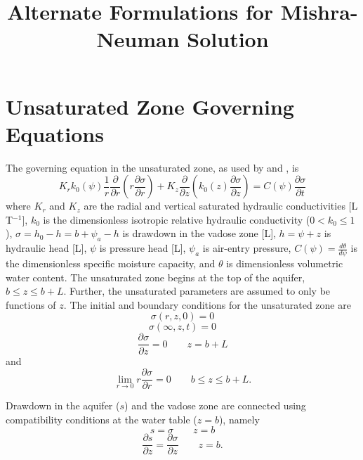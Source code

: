 \documentclass[12pt,letterpaper]{article}
\title{Alternate Formulations for Mishra-Neuman Solution}
\begin{document}
\maketitle
\linenumbers
\section{Unsaturated Zone Governing Equations}
The governing equation in the unsaturated zone, as used by \cite{mishra10} and \cite{tartakovsky07}, is
\begin{equation}
  \label{eq:unsatDim}
  K_r k_0(\psi) \frac{1}{r} \frac{\partial}{\partial r} \left( r\frac{\partial \sigma}{\partial r} \right) + K_z \frac{\partial}{\partial z} \left( k_0(z) \frac{\partial \sigma}{\partial z}\right) = C(\psi) \frac{\partial \sigma}{\partial t}
\end{equation}
where $K_r$ and $K_z$ are the radial and vertical saturated hydraulic conductivities [L T$^{-1}$], $k_0$ is the dimensionless isotropic relative hydraulic conductivity ($0 < k_0 \le 1$), $\sigma = h_0 - h = b +\psi_a - h$ is drawdown in the vadose zone [L], $h=\psi+z$ is hydraulic head [L], $\psi$ is pressure head [L], $\psi_a$ is air-entry pressure, $C(\psi)=\frac{d\theta}{d \psi}$ is the dimensionless specific moisture capacity, and $\theta$ is dimensionless volumetric water content.  The unsaturated zone begins at the top of the aquifer, $b \le z \le b+L$.  Further, the unsaturated parameters are assumed to only be functions of $z$.  The initial and boundary conditions for the unsaturated zone are  
\begin{equation}\nonumber
\sigma(r,z,0) = 0
\end{equation}
\begin{equation}\nonumber
\sigma(\infty,z,t)=0
\end{equation}
\begin{equation}\nonumber
\frac{\partial \sigma}{\partial z}=0 \qquad z=b+L
\end{equation} and 
\begin{equation}\nonumber
\lim_{r \rightarrow 0} r \frac{\partial \sigma}{\partial r} = 0 \qquad b\le z \le b+L.
\end{equation}

Drawdown in the aquifer ($s$) and the vadose zone are connected using compatibility conditions at the water table ($z=b$), namely
\begin{equation}\nonumber
s=\sigma \qquad z=b
\end{equation}
\begin{equation}\nonumber
\frac{\partial s}{\partial z}=\frac{\partial \sigma}{\partial z} \qquad z=b.
\end{equation} 
\end{document}
